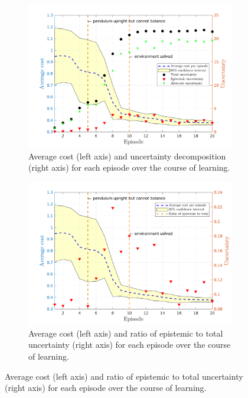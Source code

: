 \begin{figure}[htp!]
    \vspace{4ex}
  \begin{subfigure}[b]{0.48\linewidth}
    \centering
    \includegraphics[height=0.22\textheight,width=1\textwidth]{Chapter3/Figures/pen_uncertainty.png} 
    \caption{Average cost (left axis) and uncertainty decomposition (right axis) for each episode over the course of learning.} 
    \label{Fig:Re-pen-uncertainty} 
  \end{subfigure}
  \hspace{\fill}
  \begin{subfigure}[b]{0.48\linewidth}
    \centering
    \includegraphics[height=0.22\textheight,width=1\textwidth]{Chapter3/Figures/pen_uncertainty_norm.png} 
    \caption{Average cost (left axis) and ratio of epistemic to total uncertainty (right axis) for each episode over the course of learning.} 

\end{subfigure}
\end{figure}
